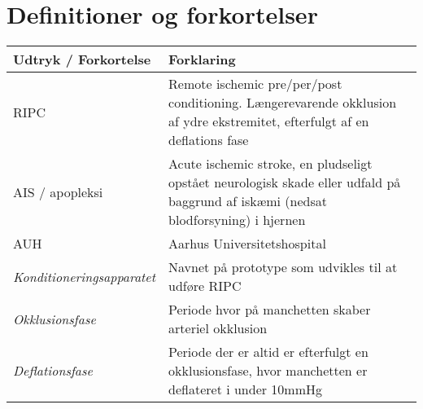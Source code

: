 	\section{Definitioner og forkortelser}
	\begin{longtable}{ |p{} |p{}| } 
		\hline
		\textbf{Udtryk / Forkortelse} &  \textbf{Forklaring} \\
		\hline
		RIPC & Remote ischemic pre/per/post conditioning. Længerevarende okklusion af ydre ekstremitet, efterfulgt af en deflations fase\\
		\hline
		AIS / apopleksi & Acute ischemic stroke, en pludseligt opstået neurologisk skade eller udfald på baggrund af iskæmi (nedsat blodforsyning) i hjernen \\
		\hline
		AUH & Aarhus Universitetshospital \\
		\hline
		\textit{Konditioneringsapparatet} & Navnet på prototype som udvikles til at udføre RIPC \\
		\hline
		\textit{Okklusionsfase} & Periode hvor på manchetten skaber arteriel okklusion \\
		\hline
		\textit{Deflationsfase} & Periode der er altid er efterfulgt en okklusionsfase, hvor manchetten er deflateret i under 10mmHg\\
		\hline
	\end{longtable}
	
